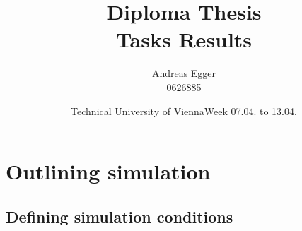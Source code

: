 \documentclass[a4paper]{article}
\title{Diploma Thesis\\Tasks Results}
\author{Andreas Egger \\0626885}
\date{Technical University of Vienna}
\begin{document}
\maketitle

\newpage

\tableofcontents

\newpage

\section{Outlining simulation}
\hfill\date{Week 07.04. to 13.04.}

\subsection{Defining simulation conditions}
\end{document}

